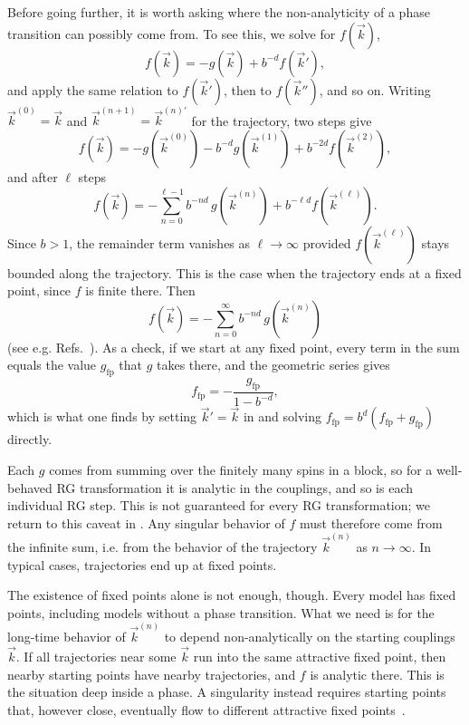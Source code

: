 Before going further, it is worth asking where the non-analyticity of a phase
transition can possibly come from. To see this, we solve 
for $f(\vec{k})$,
\begin{equation}
  f(\vec{k})=-g(\vec{k})+b^{-d}f(\vec{k}'),
\end{equation}
and apply the same relation to $f(\vec{k}')$, then to $f(\vec{k}'')$, and so on.
Writing $\vec{k}^{(0)}=\vec{k}$ and $\vec{k}^{(n+1)}=\vec{k}^{(n)\prime}$ for the
trajectory, two steps give
\begin{equation}
  f(\vec{k})=-g\left(\vec{k}^{(0)}\right)-b^{-d}g\left(\vec{k}^{(1)}\right)
             +b^{-2d}f\left(\vec{k}^{(2)}\right),
\end{equation}
and after $\ell$ steps
\begin{equation}\label{eq:RGfreeEnergyPartialSum}
  f(\vec{k})=-\sum_{n=0}^{\ell-1} b^{-nd}\,g\left(\vec{k}^{(n)}\right)
             +b^{-\ell d}f\left(\vec{k}^{(\ell)}\right).
\end{equation}
Since $b>1$, the remainder term vanishes as $\ell\to\infty$ provided
$f(\vec{k}^{(\ell)})$ stays bounded along the trajectory. This is the case when the
trajectory ends at a fixed point, since $f$ is finite there. Then
\begin{equation}\label{eq:RGfreeEnergySum}
  f(\vec{k})=-\sum_{n=0}^\infty b^{-nd}\,g\left(\vec{k}^{(n)}\right)
\end{equation}
(see e.g. Refs.~\cite{cardy_scaling_1996,kardar_fields_2007}).
As a check, if we start at any fixed point, every term in the sum equals the
value $g_\text{fp}$ that $g$ takes there, and the geometric series gives
\begin{equation}\label{eq:fFixedPoint}
  f_\text{fp}=-\frac{g_\text{fp}}{1-b^{-d}},
\end{equation}
which is what one finds by setting $\vec{k}'=\vec{k}$ in 
and solving $f_\text{fp}=b^d(f_\text{fp}+g_\text{fp})$ directly.

Each $g$ comes from summing over the finitely many spins in a block, so for a
well-behaved RG transformation it is analytic in the couplings, and so is each
individual RG step. This is not guaranteed for every RG transformation; we
return to this caveat in . Any singular
behavior of $f$ must therefore come from the infinite sum, i.e. from the
behavior of the trajectory $\vec{k}^{(n)}$ as $n\to\infty$. In typical cases,
trajectories end up at fixed points.

The existence of fixed points alone is not enough, though. Every model has
fixed points, including models without a phase transition. What we need is for
the long-time behavior of $\vec{k}^{(n)}$ to depend non-analytically on the
starting couplings $\vec{k}$. If all trajectories near some $\vec{k}$ run into the same
attractive fixed point, then nearby starting points have nearby trajectories,
and $f$ is analytic there. This is the situation deep inside a phase.
A singularity instead requires starting points that, however close, eventually
flow to different attractive fixed points~\cite{wilson_renormalization_1974,cardy_scaling_1996}.

